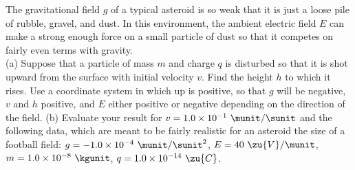 %
The gravitational field $g$ of a typical asteroid is so weak that it is just a loose pile
of rubble, gravel, and dust. In this environment, the ambient electric field
$E$ can make a strong enough force on a small  particle of dust so that it competes
on fairly even terms with gravity.\\
(a) Suppose that a particle of mass $m$ and charge $q$
is disturbed so that it is shot upward from the surface with initial velocity $v$.
Find the height $h$ to which it rises. Use a coordinate system in which up is
positive, so that $g$ will be negative, $v$ and $h$ positive, and $E$ either positive or
negative depending on the direction of the field.\answercheck\hwendpart
(b) Evaluate your result for $v=1.0\times10^{-1}\ \munit/\sunit$ and
the following data, which are meant to be fairly
realistic for an asteroid the size of a football field: $g=-1.0\times10^{-4}\ \munit/\sunit^2$,
$E=40\ \zu{V}/\munit$, $m=1.0\times10^{-8}\ \kgunit$, $q=1.0\times10^{-14}\ \zu{C}$.\answercheck\hwendpart

